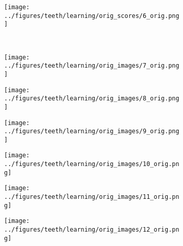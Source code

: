\begin{figure}[h!]
\begin{subfigure}{0.15\textwidth}
	\end{subfigure}
	\begin{subfigure}{0.15\textwidth}
		\centering
		\texttt{[image: ../figures/teeth/learning/orig\_scores/6\_orig.png]}
		\label{fig:1}
	\end{subfigure}
	\\
			\begin{subfigure}[b]{0.03\textwidth} %
		\centering
	\end{subfigure}
		\begin{subfigure}{0.15\textwidth}
		\centering
		\texttt{[image: ../figures/teeth/learning/orig\_images/7\_orig.png]}
		\label{fig:1}
	\end{subfigure}
	\begin{subfigure}{0.15\textwidth}
		\centering
		\texttt{[image: ../figures/teeth/learning/orig\_images/8\_orig.png]}
		\label{fig:1}
	\end{subfigure}
	\begin{subfigure}{0.15\textwidth}
		\centering
		\texttt{[image: ../figures/teeth/learning/orig\_images/9\_orig.png]}
		\label{fig:1}
	\end{subfigure}
	\begin{subfigure}{0.15\textwidth}
		\centering
		\texttt{[image: ../figures/teeth/learning/orig\_images/10\_orig.png]}
		\label{fig:1}
	\end{subfigure}
	\begin{subfigure}{0.15\textwidth}
		\centering
		\texttt{[image: ../figures/teeth/learning/orig\_images/11\_orig.png]}
		\label{fig:1}
	\end{subfigure}
	\begin{subfigure}{0.15\textwidth}
		\centering
		\texttt{[image: ../figures/teeth/learning/orig\_images/12\_orig.png]}
		\label{fig:1}
	\end{subfigure}
	\vspace{-0.35cm}
	\\
			\begin{subfigure}[b]{0.03\textwidth} %
		\centering
	\end{subfigure}
	\begin{subfigure}{0.15\textwidth}

\end{subfigure}
\end{figure}
